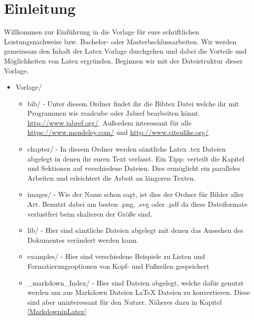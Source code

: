 \chapter{Einleitung}
\label{Einleitung}
Willkommen zur Einführung in die Vorlage für eure schriftlichen Leistungsnachweise bzw. Bachelor- oder Masterbschlussarbeiten. Wir werden gemeinsam den Inhalt der Latex Vorlage durchgehen und dabei die Vorteile und Möglichkeiten von Latex ergründen. Beginnen wir mit der Dateistruktur dieser Vorlage.

\begin{itemize}
	\item Vorlage/
		\begin{itemize}
			\item bib/ - Unter diesem Ordner findet ihr die Bibtex Datei welche ihr mit Programmen wie readcube oder Jabref bearbeiten könnt. \url{http://www.jabref.org/}. Außerdem interessant für alle \url{https://www.mendeley.com/} und \url{http://www.citeulike.org/}
			\item chapter/ - In diesem Ordner werden sämtliche Latex .tex Dateien abgelegt in denen ihr euren Text verfasst. Ein Tipp: verteilt die Kapitel und Sektionen auf verschiedene Dateien. Dies ermöglicht ein paralleles Arbeiten und erleichtert die Arbeit an längeren Texten.
			\item images/ - Wie der Name schon sagt, ist dies der Ordner für Bilder aller Art. Benutzt dabei am besten .png, .svg oder .pdf da diese Dateiformate verlustfrei beim skalieren der Größe sind.
			\item lib/ - Hier sind sämtliche Dateien abgelegt mit denen das Aussehen des Dokumentes verändert werden kann. 
			\item examples/ - Hier sind verschiedene Beispiele zu Listen und Formatierungsoptionen von Kopf- und Fußzeilen gespeichert
			\item \_markdown\_Index/ - Hier sind Dateien abgelegt, welche dafür genutzt werden um aus Markdown Dateien \LaTeX{} Dateien zu konvertieren. Diese sind aber uninteressant für den Nutzer. Näheres dazu in Kapitel \ref{MarkdowninLatex}
		\end{itemize}
\end{itemize}

